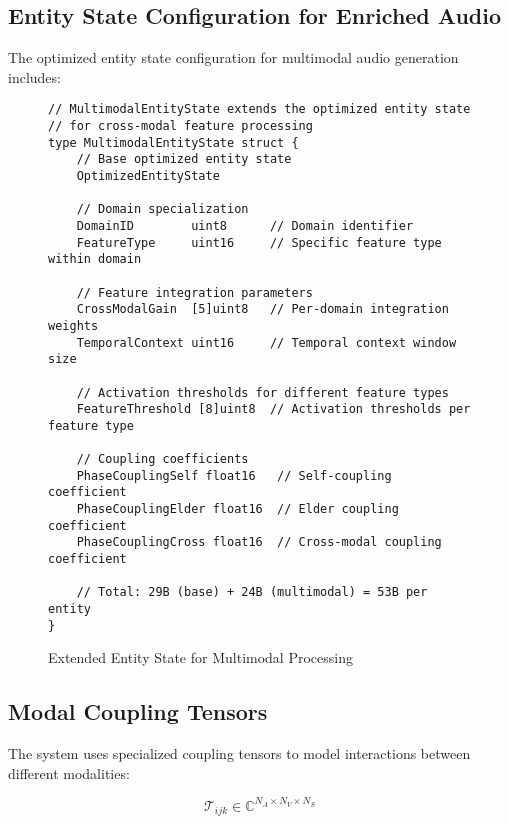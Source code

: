 \subsection{Entity State Configuration for Enriched Audio}

The optimized entity state configuration for multimodal audio generation includes:

\begin{figure}[h]
\begin{center}
\begin{minipage}{0.95\textwidth}
\begin{verbatim}
// MultimodalEntityState extends the optimized entity state
// for cross-modal feature processing
type MultimodalEntityState struct {
    // Base optimized entity state
    OptimizedEntityState
    
    // Domain specialization
    DomainID        uint8      // Domain identifier
    FeatureType     uint16     // Specific feature type within domain
    
    // Feature integration parameters
    CrossModalGain  [5]uint8   // Per-domain integration weights
    TemporalContext uint16     // Temporal context window size
    
    // Activation thresholds for different feature types
    FeatureThreshold [8]uint8  // Activation thresholds per feature type
    
    // Coupling coefficients
    PhaseCouplingSelf float16   // Self-coupling coefficient
    PhaseCouplingElder float16  // Elder coupling coefficient
    PhaseCouplingCross float16  // Cross-modal coupling coefficient
    
    // Total: 29B (base) + 24B (multimodal) = 53B per entity
}
\end{verbatim}
\end{minipage}
\caption{Extended Entity State for Multimodal Processing}
\end{center}
\end{figure}

\subsection{Modal Coupling Tensors}

The system uses specialized coupling tensors to model interactions between different modalities:

\begin{equation}
\mathcal{T}_{ijk} \in \mathbb{C}^{N_A \times N_V \times N_S}
\end{equation}

